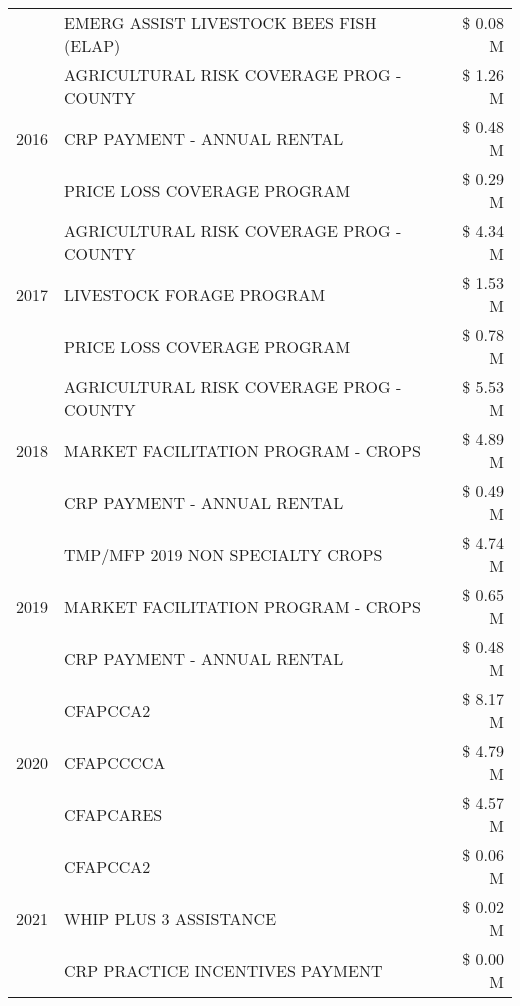 \begin{tabular}{llr}
 & EMERG ASSIST LIVESTOCK BEES FISH (ELAP) & \$ 0.08 M \\
\cline{1-3}
\multirow[t]{3}{*}{2016} & AGRICULTURAL RISK COVERAGE PROG - COUNTY & \$ 1.26 M \\
 & CRP PAYMENT - ANNUAL RENTAL & \$ 0.48 M \\
 & PRICE LOSS COVERAGE PROGRAM & \$ 0.29 M \\
\cline{1-3}
\multirow[t]{3}{*}{2017} & AGRICULTURAL RISK COVERAGE PROG - COUNTY & \$ 4.34 M \\
 & LIVESTOCK FORAGE PROGRAM & \$ 1.53 M \\
 & PRICE LOSS COVERAGE PROGRAM & \$ 0.78 M \\
\cline{1-3}
\multirow[t]{3}{*}{2018} & AGRICULTURAL RISK COVERAGE PROG - COUNTY & \$ 5.53 M \\
 & MARKET FACILITATION PROGRAM - CROPS & \$ 4.89 M \\
 & CRP PAYMENT - ANNUAL RENTAL & \$ 0.49 M \\
\cline{1-3}
\multirow[t]{3}{*}{2019} & TMP/MFP 2019 NON SPECIALTY CROPS & \$ 4.74 M \\
 & MARKET FACILITATION PROGRAM - CROPS & \$ 0.65 M \\
 & CRP PAYMENT - ANNUAL RENTAL & \$ 0.48 M \\
\cline{1-3}
\multirow[t]{3}{*}{2020} & CFAPCCA2 & \$ 8.17 M \\
 & CFAPCCCCA & \$ 4.79 M \\
 & CFAPCARES & \$ 4.57 M \\
\cline{1-3}
\multirow[t]{3}{*}{2021} & CFAPCCA2 & \$ 0.06 M \\
 & WHIP PLUS 3 ASSISTANCE & \$ 0.02 M \\
 & CRP PRACTICE INCENTIVES PAYMENT & \$ 0.00 M \\
\cline{1-3}
\bottomrule
\end{tabular}
